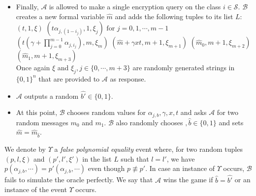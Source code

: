 \begin{itemize}
\item Finally, $\mathcal{A}$ is allowed to make a single encryption query on the class $i\in\mathcal{S}$. $\mathcal{B}$ creates a new formal variable $\hat{m}$ and adds the following tuples to its list $L$:\\

 \subitem $(t,1,\xi)$
 \subitem $(t\alpha_{j,\left(1-i_{j}\right)},1,\xi_{j}) \text{ for } j=0,1,\cdots,m-1$
 \subitem $(t(\gamma+\prod_{j=0}^{m-1}\alpha_{j,i_j}),m,\xi_{m})$
 \subitem $(\hat{m}+\gamma xt,m+1,\xi_{m+1})$
 \subitem $(\hat{m}_0,m+1,\xi_{m+2})$
 \subitem $(\hat{m}_1,m+1,\xi_{m+3})$\\

\noindent Once again $\xi$ and $\xi_j, j\in\{0,\cdots,m+3\}$ are randomly generated strings in $\{0,1\}^{n}$ that are provided to $\mathcal{A}$ as response.\\

\item $\mathcal{A}$ outputs a random $\hat{b'}\in\{0,1\}$.\\

\item At this point, $\mathcal{B}$ chooses random values for $\alpha_{j,b},\gamma,x,t$ and asks $\mathcal{A}$ for two random messages $m_0$ and $m_1$. $\mathcal{B}$ also randomly chooses $,\hat{b}\in\{0,1\}$ and sets $\hat{m}=\hat{m}_{\hat{b}}$.

\end{itemize}

\noindent We denote by $\Upsilon$ a \emph{false polynomial equality} event where, for two random tuples $(p,l,\xi)$ and $(p',l',\xi')$ in the list $L$ such that $l=l'$, we have $p(\alpha_{j,b},\cdots)=p'(\alpha_{j,b},\cdots)$ even though $p\not\equiv p'$. In case an instance of $\Upsilon$ occurs, $\mathcal{B}$ fails to simulate the oracle perfectly. We say that $\mathcal{A}$ wins the game if $\hat{b}=\hat{b'}$ or an instance of the event $\Upsilon$ occurs. 

\begin{table}[!t]
\centering
\captionsetup{font=scriptsize}
\caption{Upper Bounds on Contributions to Length of $L$}
\label{tab:tuple}
\end{table}

